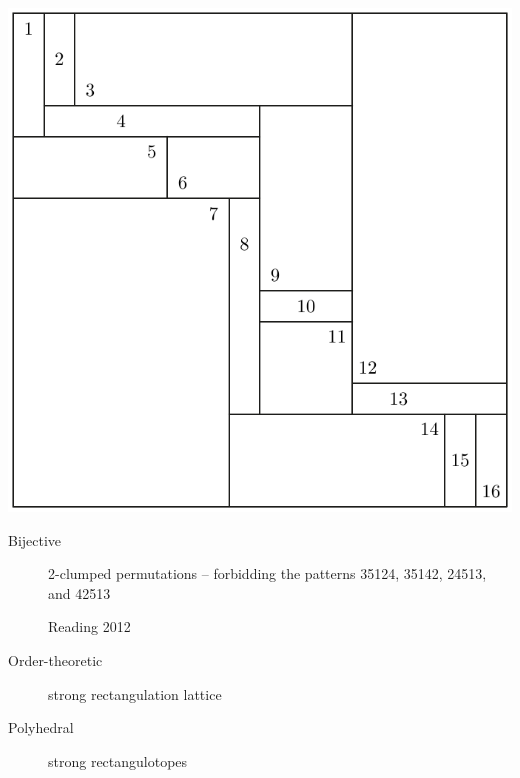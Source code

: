 \documentclass[11pt]{beamer}%
\newcommand{\red}{\color{darkred}}
\newcommand{\green}{\color{darkgreen}}
\newcommand{\auth}[1]{{\green\hfill{\footnotesize #1}}}
\renewcommand{\em }{\red}
\begin{document}
\begin{frame}
\begin{center}
      \includegraphics[height=.4\textheight]{weakRectangulation.pdf}
    \end{center}  

  \pause
  \begin{description}
  \item[Bijective] {\em 2-clumped permutations} -- forbidding the patterns 3{\green 51}24, 3{\green 51}42, 24{\green 51}3, and 42{\green 51}3

    \auth{Reading 2012}
    \pause
  \item[Order-theoretic] strong rectangulation lattice
  \item[Polyhedral] strong rectangulotopes
  \end{description}
\end{frame}
\end{document}
